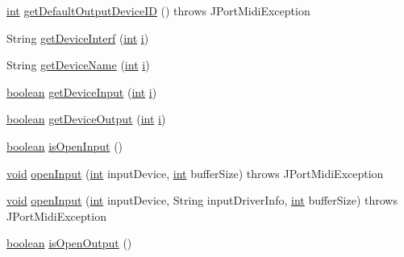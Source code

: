\begin{DoxyCompactItemize}
\item 
\hyperlink{xmltok_8h_a5a0d4a5641ce434f1d23533f2b2e6653}{int} \hyperlink{classjportmidi_1_1_j_port_midi_af28107069c85363433b6faba599b20f2}{get\+Default\+Output\+Device\+ID} ()  throws J\+Port\+Midi\+Exception 
\item 
String \hyperlink{classjportmidi_1_1_j_port_midi_a9171d44c319d1df58a689c3daf4c3461}{get\+Device\+Interf} (\hyperlink{xmltok_8h_a5a0d4a5641ce434f1d23533f2b2e6653}{int} \hyperlink{checksum_8c_ab80e330a3bc9e38c1297fe17381e92b4}{i})
\item 
String \hyperlink{classjportmidi_1_1_j_port_midi_a6d24bd85e5d573099ca88833f8ef8c75}{get\+Device\+Name} (\hyperlink{xmltok_8h_a5a0d4a5641ce434f1d23533f2b2e6653}{int} \hyperlink{checksum_8c_ab80e330a3bc9e38c1297fe17381e92b4}{i})
\item 
\hyperlink{cext_8h_a7670a4e8a07d9ebb00411948b0bbf86d}{boolean} \hyperlink{classjportmidi_1_1_j_port_midi_a79e3eef8ffb4c8d504470a53e79dffe7}{get\+Device\+Input} (\hyperlink{xmltok_8h_a5a0d4a5641ce434f1d23533f2b2e6653}{int} \hyperlink{checksum_8c_ab80e330a3bc9e38c1297fe17381e92b4}{i})
\item 
\hyperlink{cext_8h_a7670a4e8a07d9ebb00411948b0bbf86d}{boolean} \hyperlink{classjportmidi_1_1_j_port_midi_a4bc5e821298ccdc5e86cbaae93ca7e11}{get\+Device\+Output} (\hyperlink{xmltok_8h_a5a0d4a5641ce434f1d23533f2b2e6653}{int} \hyperlink{checksum_8c_ab80e330a3bc9e38c1297fe17381e92b4}{i})
\item 
\hyperlink{cext_8h_a7670a4e8a07d9ebb00411948b0bbf86d}{boolean} \hyperlink{classjportmidi_1_1_j_port_midi_a6ec30204d58492c3650acb0b9f794efc}{is\+Open\+Input} ()
\item 
\hyperlink{sound_8c_ae35f5844602719cf66324f4de2a658b3}{void} \hyperlink{classjportmidi_1_1_j_port_midi_a031b6a6ebd649247a785f62f62f5a988}{open\+Input} (\hyperlink{xmltok_8h_a5a0d4a5641ce434f1d23533f2b2e6653}{int} input\+Device, \hyperlink{xmltok_8h_a5a0d4a5641ce434f1d23533f2b2e6653}{int} buffer\+Size)  throws J\+Port\+Midi\+Exception      
\item 
\hyperlink{sound_8c_ae35f5844602719cf66324f4de2a658b3}{void} \hyperlink{classjportmidi_1_1_j_port_midi_a21a985c383a067fb2d424f655f58efb3}{open\+Input} (\hyperlink{xmltok_8h_a5a0d4a5641ce434f1d23533f2b2e6653}{int} input\+Device, String input\+Driver\+Info, \hyperlink{xmltok_8h_a5a0d4a5641ce434f1d23533f2b2e6653}{int} buffer\+Size)  throws J\+Port\+Midi\+Exception     
\item 
\hyperlink{cext_8h_a7670a4e8a07d9ebb00411948b0bbf86d}{boolean} \hyperlink{classjportmidi_1_1_j_port_midi_aea385c17c98a0612ac6fa0c110802f43}{is\+Open\+Output} ()

\end{DoxyCompactItemize}
